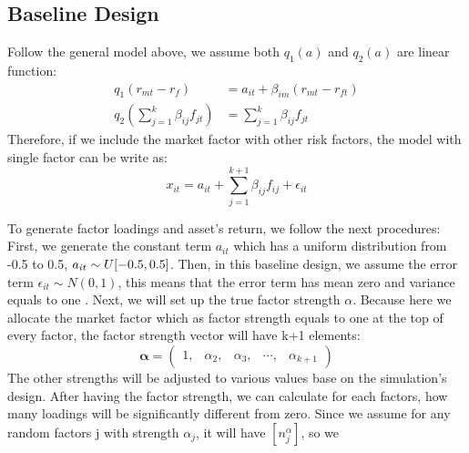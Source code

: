 \documentclass[12pt]{article}
\begin{document}
\subsection{Baseline Design}\label{base}
Follow the general model above, we assume both $q_1(a)$ and $q_2(a)$ are linear function:
\begin{align*}
q_1({r_{mt} - r_f}) &= a_{it} +\beta_{im} (r_{mt} - r_{ft})\\
q_2(\sum_{j = 1}^{k}\beta_{ij}f_{jt}) &=\sum_{j = 1}^{k}\beta_{ij}f_{jt}
\end{align*}
Therefore, if we include the market factor with other risk factors, the model with single factor can be write as:
	\[   x_{it} = a_{it} + \sum_{j = 1}^{k+1}  \beta_{ij}f_{ij} +\epsilon_{it}  \tag{5} \label{singlefactor} \]


To generate factor loadings and asset's return, we follow the next procedures:
First, we generate the constant term $a_{it}$ which has a uniform distribution from -0.5 to 0.5, $a_{it} \sim \mathnormal{U}[-0.5,0.5]$.
Then, in this baseline design, we assume the error term $\epsilon_{it}\sim N(0,1)$, this means that the error term has mean zero and variance equals to one .
Next, we will set up the true factor strength $\alpha$.
Because here we allocate the market factor which as factor strength equals to one at the top of every factor, the factor strength vector will have k+1 elements:
\[  \mathbf{\alpha} = \begin{pmatrix}
1,&\alpha_2,&\alpha_3,&\cdots,&\alpha_{k+1}
\end{pmatrix}  \]
The other strengths will be adjusted to various values base on the simulation's design.
After having the factor strength, we can calculate for each factors, how many loadings will be significantly different from zero.
Since we assume for any random factors j with strength $\alpha_j$, it will have $[n^\alpha_j]$, so we 
\end{document}
